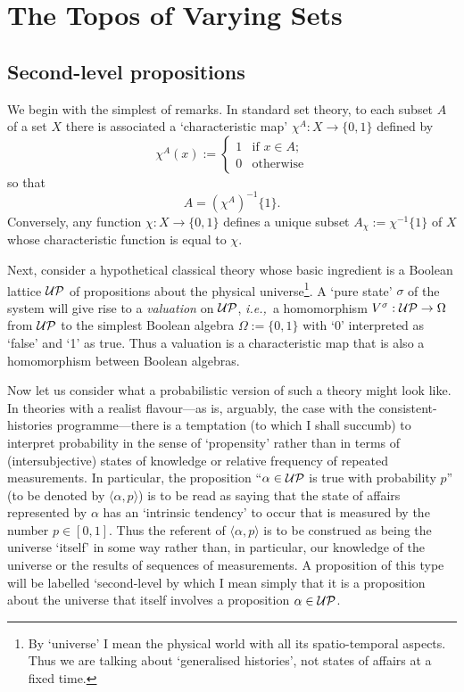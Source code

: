 \documentclass[12pt]{article}
\let\ssection=\section
\renewcommand{\section}{\setcounter{equation}{0}\ssection}
\newcounter{def-number}[section]
\newcommand{\ba}{\begin{array}}
\newcommand{\ea}{\end{array}}
\newcommand{\beq}{\begin{equation}}
\newcommand{\eeq}{\end{equation}}
\newcommand{\ie}{{\em i.e.,\ }}
\renewcommand{\a}{\alpha}                   %
\newcommand{\gp}[2]{\langle#1,#2\rangle}
\newcommand{\s}{\sigma}
\newcommand{\map}{\rightarrow}
\newcommand{\Om}{\Omega}
\newcommand{\UP}{{\cal UP}}
\begin{document}
\section{The Topos of Varying Sets}
\subsection{Second-level propositions}\label{Subsec:second-level}
We begin with the simplest of remarks. In standard set theory,
to each subset $A$ of a set $X$ there is associated a
`characteristic map' $\chi^A:X\map\{0,1\}$ defined by
\beq
		\chi^A(x):=\left\{\ba{ll}
						1&\mbox{if $x\in A$};\\	\label{Def:chiA}
						0&\mbox{otherwise}
						\ea
				\right.
\eeq
so that
\beq
			A=(\chi^A)^{-1}\{1\}.			\label{A=chiA-1}
\eeq
Conversely, any function $\chi:X\map\{0,1\}$ defines a unique subset
$A_\chi:=\chi^{-1}\{1\}$ of $X$ whose characteristic function is
equal to $\chi$.

	Next, consider a hypothetical classical theory whose basic
ingredient is a Boolean lattice $\UP$ of propositions about the
physical universe\footnote{By `universe' I mean the physical world
with all its spatio-temporal aspects. Thus we are talking about
`generalised histories', not states of affairs at a fixed time.}. A
`pure state' $\s$ of the system will give rise to a {\em
valuation\/} on $\UP$, \ie a homomorphism $V^\s:\UP\map \Om$ from
$\UP$ to the simplest Boolean algebra $\Om:=\{0,1\}$ with `0'
interpreted as `false' and `1' as true. Thus a valuation is a
characteristic map that is also a homomorphism between Boolean
algebras.

	Now let us consider what a probabilistic version of such a
theory might look like. In theories with a realist flavour---as is,
arguably, the case with the consistent-histories programme---there
is a temptation (to which I shall succumb) to interpret probability
in the sense of `propensity' rather than in terms of
(intersubjective) states of knowledge or relative frequency of
repeated measurements. In particular, the proposition ``$\a\in\UP$
is true with probability $p$'' (to be denoted by $\gp\a p$) is to be
read as saying that the state of affairs represented by $\a$ has an
`intrinsic tendency' to occur that is measured by the number
$p\in[0,1]$. Thus the referent of $\gp{\a}p$ is to be construed as
being the universe `itself' in some way rather than, in particular,
our knowledge of the universe or the results of sequences of
measurements. A proposition of this type will be labelled
`second-level by which I mean simply that it is a proposition about
the universe that itself involves a proposition $\a\in\UP$.
\end{document}
